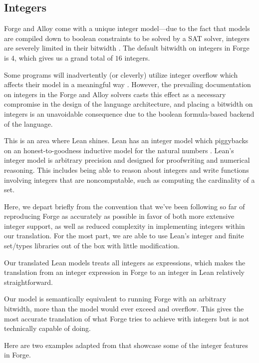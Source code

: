 \subsection{Integers}\label{sec:integers}
Forge and Alloy come with a unique integer model---due to the fact that models are compiled down to boolean constraints to be solved by a SAT solver, integers are severely limited in their bitwidth \cite{jackson2012software,nelson2024artifact}. The default bitwidth on integers in Forge is $4$, which gives us a grand total of $16$ integers. 

Some programs will inadvertently (or cleverly) utilize integer overflow which affects their model in a meaningful way \cite{ngpdbccdlrrvwwk-oopsla-2024}. However, the prevailing documentation on integers in the Forge and Alloy solvers casts this effect as a necessary compromise in the design of the language architecture, and placing a bitwidth on integers is an unavoidable consequence due to the boolean formula-based backend of the language. 

This is an area where Lean shines. Lean has an integer model which piggybacks on an honest-to-goodness inductive model for the natural numbers \cite{avigad2024theorem}. Lean's integer model is arbitrary precision and designed for proofwriting and numerical reasoning. This includes being able to reason about integers and write functions involving integers that are noncomputable, such as computing the cardinality of a set. 

Here, we depart briefly from the convention that we've been following so far of reproducing Forge as accurately as possible in favor of both more extensive integer support, as well as reduced complexity in implementing integers within our translation. For the most part, we are able to use Lean's integer and finite set/types libraries out of the box with little modification. 

Our translated Lean models treats all integers as expressions, which makes the translation from an integer expression in Forge to an integer in Lean relatively straightforward. 

Our model is semantically equivalent to running Forge with an arbitrary bitwidth, more than the model would ever exceed and overflow. This gives the most accurate translation of what Forge tries to achieve with integers but is not technically capable of doing. 

Here are two examples adapted from \cite{jackson2012software} that showcase some of the integer features in Forge. 

